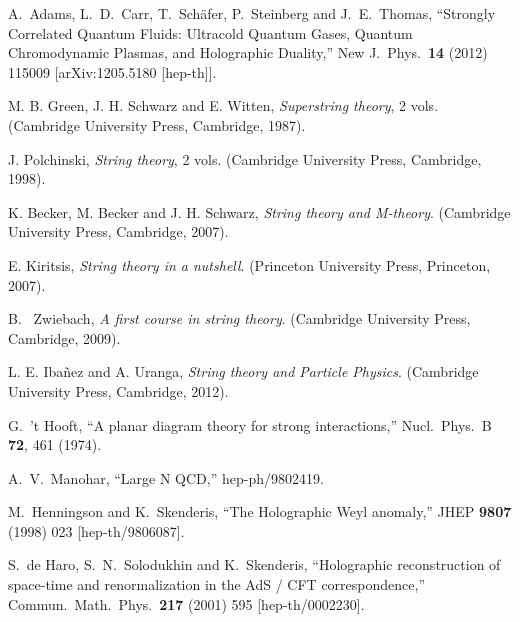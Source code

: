 \documentclass[12pt,notitlepage]{article}
\begin{document}
\begin{thebibliography}{99.}
 
  A.~Adams, L.~D.~Carr, T.~Sch\"afer, P.~Steinberg and J.~E.~Thomas,
  ``Strongly Correlated Quantum Fluids: Ultracold Quantum Gases, Quantum Chromodynamic Plasmas, and Holographic Duality,''
  New J.\ Phys.\  {\bf 14} (2012) 115009
  [arXiv:1205.5180 [hep-th]].
 
 
 M. B. Green, J. H. Schwarz and E. Witten, {\it Superstring theory}, 2 vols. 
 (Cambridge University Press, Cambridge, 1987). 
 
   J. Polchinski,  {\it String theory}, 2 vols. 
 (Cambridge University Press, Cambridge, 1998). 

 
 K. Becker, M. Becker and J. H. Schwarz, 
 {\it String theory and M-theory}.  (Cambridge University Press, Cambridge, 2007). 
 
E. Kiritsis,  {\it String theory in a nutshell}.  (Princeton University Press, Princeton, 2007). 
 

 B. ~Zwiebach, {\it A first course in string theory}. (Cambridge University Press, Cambridge, 2009). 
 
 
L. E. Iba\~nez and A. Uranga,  {\it String theory and Particle Physics}.
(Cambridge University Press, Cambridge, 2012). 

 

  G.~'t Hooft,
  ``A planar diagram theory for strong interactions,''
  Nucl.\ Phys.\  B {\bf 72}, 461 (1974).





  A.~V.~Manohar,
  ``Large N QCD,''
  hep-ph/9802419.



  M.~Henningson and K.~Skenderis,
  ``The Holographic Weyl anomaly,''
  JHEP {\bf 9807} (1998) 023
  [hep-th/9806087].
 
 
 
 
  S.~de Haro, S.~N.~Solodukhin and K.~Skenderis,
  ``Holographic reconstruction of space-time and renormalization in the AdS / CFT correspondence,''
  Commun.\ Math.\ Phys.\  {\bf 217} (2001) 595
  [hep-th/0002230].
  

\end{thebibliography}
\end{document}
